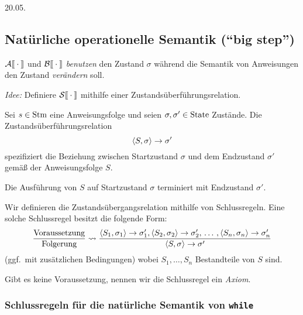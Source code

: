 \newpage
\hfill 20.05.
\subsection{Natürliche operationelle Semantik (``big step'')}

$\mathcal{A}\mathrm{[}\kern-.14em\mathrm{[}\cdot\mathrm{]}\kern-.14em\mathrm{]}$ und $\mathcal{B}\mathrm{[}\kern-.14em\mathrm{[}\cdot\mathrm{]}\kern-.14em\mathrm{]}$ \emph{benutzen} den Zustand $\sigma$ während die Semantik von Anweisungen den Zustand \emph{verändern} soll.

\emph{Idee:} Definiere $\mathcal{S}\mathrm{[}\kern-.14em\mathrm{[}\cdot\mathrm{]}\kern-.14em\mathrm{]}$ mithilfe einer Zustandsüberführungsrelation.

\begin{definition}
    Sei $s \in \operatorname{Stm}$ eine Anweisungsfolge und seien $\sigma, \sigma' \in \operatorname{State}$ Zustände. Die Zustandsüberführungsrelation
    \[
    \langle S, \sigma \rangle \to \sigma'
    \]
    spezifiziert die Beziehung zwischen Startzustand $\sigma$ und dem Endzustand $\sigma'$ gemäß der Anweisungsfolge $S$.
\end{definition}

\begin{remark}[Bedeutung]
    Die Ausführung von $S$ auf Startzustand $\sigma$ terminiert mit Endzustand $\sigma'$.
\end{remark}

\par\medskip
\begin{notation}
    Wir definieren die Zustandsübergangsrelation mithilfe von Schlussregeln. Eine solche Schlussregel besitzt die folgende Form:
    \[
    \frac{\text{Voraussetzung}}{\text{Folgerung}} \leadsto \frac{\langle S_1, \sigma_1 \rangle \to \sigma_1', \langle S_2, \sigma_2 \rangle \to \sigma_2', \,\dots\, , \langle S_n, \sigma_n \rangle \to \sigma_n'}{\langle S, \sigma \rangle \to \sigma'}
    \]
    (ggf.\ mit zusätzlichen Bedingungen) wobei $S_1, \dots, S_n$ Bestandteile von $S$ sind.

    Gibt es keine Voraussetzung, nennen wir die Schlussregel ein \emph{Axiom}.
\end{notation}



\subsubsection{Schlussregeln für die natürliche Semantik von \texttt{while}}

